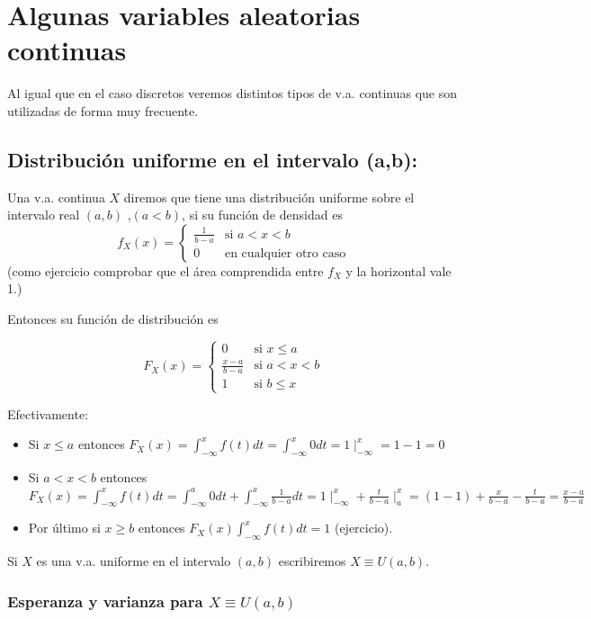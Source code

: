 \documentclass[12pt]{report}
\begin{document}
   \section{Algunas variables aleatorias continuas}
Al igual que en el caso discretos veremos distintos tipos de v.a. continuas que son
utilizadas de forma muy frecuente.

\subsection{Distribución uniforme en el intervalo (a,b):}

Una v.a. continua $X$ diremos que tiene una distribución uniforme sobre el intervalo real
$(a,b)$ ,$(a<b)$, si su función de densidad es $$f_X(x)=\left\{\begin{array}{ll}
\frac{1}{b-a} & \mbox{si } a<x<b\\ 0  & \mbox{en cualquier otro caso}
\end{array}
\right. $$ (como ejercicio comprobar que el área comprendida entre $f_X$ y la horizontal
vale 1.)

Entonces su función de distribución es

$$F_X(x)=\left\{\begin{array}{ll} 0  & \mbox{si } x\leq a\\
\frac{x-a}{b-a} & \mbox{si } a<x<b\\ 1  & \mbox{si } b\leq x
\end{array}
\right. $$

Efectivamente:

\begin{itemize}
    \item Si $x\leq a$ entonces $F_X(x)=\int_{-\infty}^{x} f(t) dt= \int_{-\infty}^{x}
    0 dt= 1\mid_{-\infty}^{x}=1-1=0$
    \item Si $a<x<b$ entonces $F_X(x)=\int_{-\infty}^{x} f(t) dt= \int_{-\infty}^{a}
    0 dt+\int_{-\infty}^{x} \frac{1}{b-a} dt= 1\mid_{-\infty}^{x}+
    \frac{t}{b-a}\mid_{a}^{x}=(1-1) +\frac{x}{b-a}-\frac{t}{b-a}=\frac{x-a}{b-a}$
    \item  Por último si $x\geq b$ entonces $F_X(x)\int_{-\infty}^{x} f(t)
    dt=1$ (ejercicio).
\end{itemize}

Si $X$ es una v.a. uniforme en el intervalo $(a,b)$ escribiremos $X\equiv U(a,b)$.

\subsubsection{Esperanza y varianza  para $X\equiv U(a,b)$}
\end{document}
